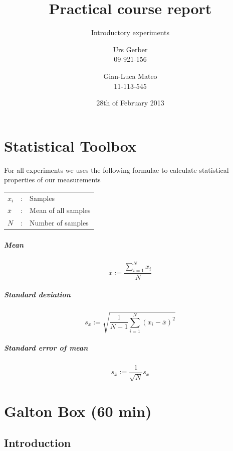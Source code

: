 \documentclass{scrreprt}
\author{Urs Gerber\\09-921-156 \and Gian-Luca Mateo\\11-113-545}
\date{28th of February 2013}
\title{Practical course report}
\subtitle{Introductory experiments}
\begin{document}
\maketitle

\tableofcontents

\newpage

\chapter{Statistical Toolbox}
For all experiments we uses the following formulae to calculate statistical properties of our measurements
\begin{center}
    \begin{tabular}{lcl}
    $x_i$ & : & Samples\\
	$\overline{x}$ & : & Mean of all samples\\
	$N$ & : & Number of samples
\end{tabular}
\end{center}

\paragraph*{Mean}
\begin{equation}
\overline{x}:=\frac{\sum_{i=1}^N{x_i}}{N}
\end{equation}

\paragraph*{Standard deviation}
\begin{equation}
s_x:=\sqrt{\frac{1}{N-1}\sum_{i=1}^N{(x_i-\overline{x})^2}}
\end{equation}

\paragraph*{Standard error of mean}
\begin{equation}
s_{\overline{x}}:= \frac{1}{\sqrt{N}} s_x
\end{equation}

\chapter[Galton Box]{Galton Box (60 min)}
\section{Introduction}
\end{document}
